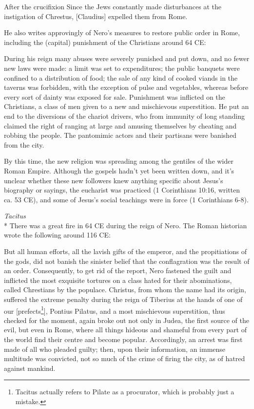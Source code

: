 \documentclass[10pt,twoside]{article} %
\newcommand{\doimage}[2]{\texttt{[image: \#2]}\label{fig:#2}}
\newcommand{\figbasic}[4]{ %
    \ifthenelse{\isodd{\pageref{fig:#2}}}{}{\hfill}
    \ifstrempty{#3}{
      \doimage{#1}{#2}
    }{
      \makebox{\doimage{#1}{#2} \\ #3}
    }
    \ifthenelse{\isodd{\pageref{fig:#2}}}{\hfill}{}
    \par
}
\newcommand{\fig}[2][0.4]{
  \figbasic{#1}{#2}{}{}
}
\newcommand{\quotesize}{\normalsize{}}
\newcommand{\comm}[1]{\begingroup \color{black!50} #1\endgroup}
\newenvironment{quotetext}{\begingroup\quotesize}{\endgroup}
\newcommand{\intex}[1]{\index[texts]{#1}}
\newcommand{\reftex}[1]{#1\intex{#1}}
\newcommand{\subhead}[1]{\emph{#1}\\*}
\begin{document}
\begin{section}{After the crucifixion}
\begin{quotetext}
Since the Jews constantly made disturbances at the instigation of Chrestus, [Claudius] expelled them from Rome.
\end{quotetext}

\comm{He also writes approvingly of Nero's measures to
restore public order in Rome, including the (capital) punishment of the Christians around 64 CE:}

\begin{quotetext}
During his reign many abuses were severely punished and put down, and
no fewer new laws were made: a limit was set to expenditures; the
public banquets were confined to a distribution of food; the sale of
any kind of cooked viands in the taverns was forbidden, with the
exception of pulse and vegetables, whereas before every sort of dainty
was exposed for sale. Punishment was inflicted on the Christians, a
class of men given to a new and mischievous superstition. He put an
end to the diversions of the chariot drivers, who from immunity of
long standing claimed the right of ranging at large and amusing
themselves by cheating and robbing the people. The pantomimic actors
and their partisans were banished from the city.
\end{quotetext}

\fig[0.6]{nero}

\comm{By this time, the new religion was  spreading among the gentiles of the wider Roman Empire.
Although the gospels hadn't yet been written down, and it's unclear whether
these new followers knew anything specific about Jesus's biography or sayings,
the eucharist was practiced (\reftex{1 Corinthians 10:16}, written ca. 53 CE),
and some of Jesus's social teachings were in force (\reftex{1 Corinthians 6-8}).
}


\subhead{Tacitus}\label{tacitus}%
\comm{There was a great fire in 64 CE during the reign of Nero. The Roman historian wrote the following around 116 CE:}

\begin{quotetext}
But all human efforts, all the lavish gifts of the emperor, and the
propitiations of the gods, did not banish the sinister belief that the
conflagration was the result of an order. Consequently, to get rid of
the report, Nero fastened the guilt and inflicted the most exquisite
tortures on a class hated for their abominations, called Chrestians by
the populace. Christus, from whom the name had its origin, suffered
the extreme penalty during the reign of Tiberius at the hands of one
of our [prefects\footnote{Tacitus actually refers to Pilate as a procurator, which is probably just a mistake.}], Pontius Pilatus, and a most mischievous
superstition, thus checked for the moment, again broke out not only in
Judea, the first source of the evil, but even in Rome, where all
things hideous and shameful from every part of the world find their
centre and become popular. Accordingly, an arrest was first made of
all who pleaded guilty; then, upon their information, an immense
multitude was convicted, not so much of the crime of firing the city,
as of hatred against mankind.
\end{quotetext}


\end{section}
\end{document}

